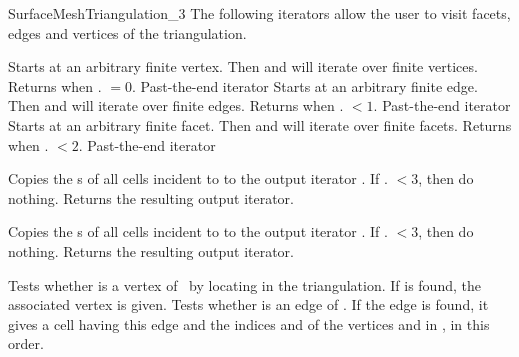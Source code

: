 \begin{ccRefConcept}{SurfaceMeshTriangulation_3}
The following iterators allow the user to visit facets, edges and vertices
of the triangulation.

{Starts at an arbitrary finite vertex. Then \ccc{++} and \ccc{--} will
iterate over finite vertices. Returns  when
\ccVar. $=0$.} 
\ccGlue
{}
{Past-the-end iterator}
\ccGlue
{}
{Starts at an arbitrary finite edge. Then \ccc{++} and \ccc{--} will
iterate over finite edges. Returns  when
\ccVar. $<1$.} 
\ccGlue
{}
{Past-the-end iterator}
\ccGlue
{}
{Starts at an arbitrary finite facet. Then \ccc{++} and \ccc{--} will
iterate over finite facets. Returns  when
\ccVar. $<2$.}
\ccGlue
{}
{Past-the-end iterator}

{Copies the s of all cells incident to  to the output
iterator .  If \ccVar. $<3$, then do nothing.
Returns the resulting output iterator.
}

{Copies the s of all cells incident to  to the output
iterator .  If \ccVar. $<3$, then do nothing.
Returns the resulting output iterator.}

{Tests whether  is a vertex of \ccVar\ by locating  in
the triangulation. If  is found, the associated vertex 
is given.}
\ccGlue
{}
{Tests whether  is an edge of \ccVar. If the edge is found,
it gives a cell  having this edge and the indices 
and  of the vertices  and  in , in this order.
}


\end{ccRefConcept}
